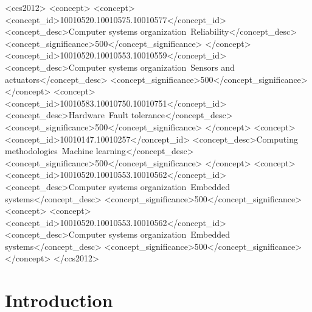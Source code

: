 \documentclass[manuscript]{acmart}
\begin{document}
\begin{CCSXML}
	<ccs2012>
	<concept>
	<concept>
	<concept_id>10010520.10010575.10010577</concept_id>
	<concept_desc>Computer systems organization~Reliability</concept_desc>
	<concept_significance>500</concept_significance>
	</concept>
	<concept_id>10010520.10010553.10010559</concept_id>
	<concept_desc>Computer systems organization~Sensors and actuators</concept_desc>
	<concept_significance>500</concept_significance>
	</concept>
	<concept>
	<concept_id>10010583.10010750.10010751</concept_id>
	<concept_desc>Hardware~Fault tolerance</concept_desc>
	<concept_significance>500</concept_significance>
	</concept>
	<concept>
	<concept_id>10010147.10010257</concept_id>
	<concept_desc>Computing methodologies~Machine learning</concept_desc>
	<concept_significance>500</concept_significance>
	</concept>
	<concept>
	<concept_id>10010520.10010553.10010562</concept_id>
	<concept_desc>Computer systems organization~Embedded systems</concept_desc>
	<concept_significance>500</concept_significance>
	<concept>
	<concept>
	<concept_id>10010520.10010553.10010562</concept_id>
	<concept_desc>Computer systems organization~Embedded systems</concept_desc>
	<concept_significance>500</concept_significance>
	</concept>
	</ccs2012>
\end{CCSXML}
 \maketitle
\section{Introduction}
\label{sec:intro}
\end{document}
